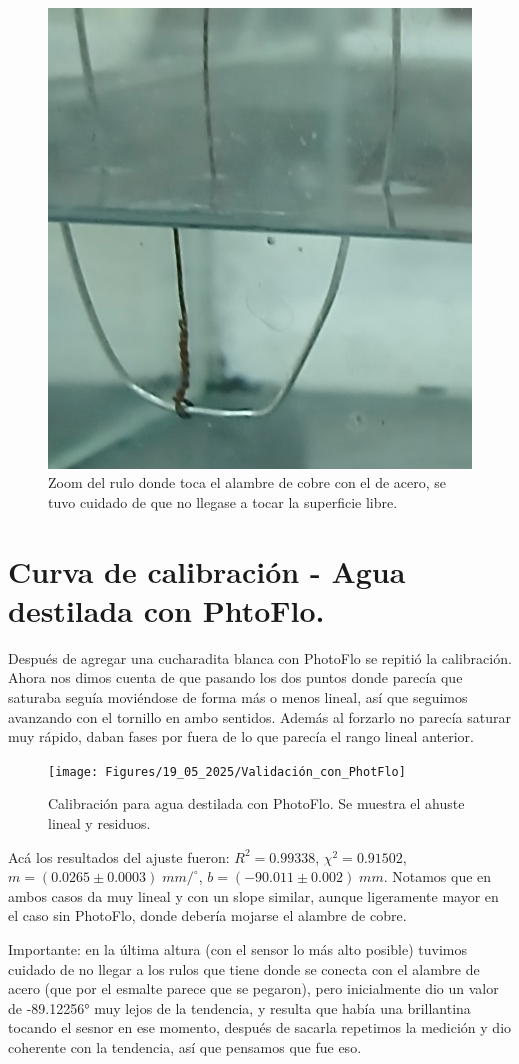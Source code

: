 \begin{figure}[th!]
	\centering
	\includegraphics[width=0.2357\linewidth]{Figures/19_05_2025/Rulos}
	\caption{Zoom del rulo donde toca el alambre de cobre con el de acero, se tuvo cuidado de que no llegase a tocar la superficie libre.}
	\label{fig:rulos}
\end{figure}


\section{Curva de calibración - Agua destilada con PhtoFlo.}
Después de agregar una cucharadita blanca con PhotoFlo se repitió la calibración. Ahora nos dimos cuenta de que pasando los dos puntos donde parecía que saturaba seguía moviéndose de forma más o menos lineal, así que seguimos avanzando con el tornillo en ambo sentidos. Además al forzarlo no parecía saturar muy rápido, daban fases por fuera de lo que parecía el rango lineal anterior.

\begin{figure}[th!]
	\centering
	\texttt{[image: Figures/19\_05\_2025/Validación\_con\_PhotFlo]}
	\caption{Calibración para agua destilada con PhotoFlo. Se muestra el ahuste lineal y residuos.}
	\label{fig:validacionconphotflo}
\end{figure}


Acá los resultados del ajuste fueron: $R^2=0.99338$,	$\chi^2=0.91502$,	$m = (0.0265 \pm 0.0003)\; mm/^\circ$,	$b = (-90.011 \pm 0.002)\; mm$. Notamos que en ambos casos da muy lineal y con un slope similar, aunque ligeramente mayor en el caso sin PhotoFlo, donde debería mojarse el alambre de cobre. %



Importante: en la última altura (con el sensor lo más alto posible) tuvimos cuidado de no llegar a los rulos que tiene donde se conecta con el alambre de acero (que por el esmalte parece que se pegaron), pero inicialmente dio un valor de -89.12256° muy lejos de la tendencia, y resulta que había una brillantina tocando el sesnor en ese momento, después de sacarla repetimos la medición y dio coherente con la tendencia, así que pensamos que fue eso.


